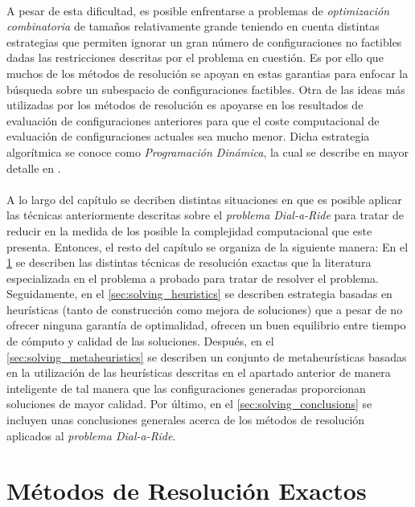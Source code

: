 \documentclass{subfiles}
\begin{document}
      \paragraph{}
      A pesar de esta dificultad, es posible enfrentarse a problemas de \emph{optimización combinatoria} de tamaños relativamente grande teniendo en cuenta distintas estrategias que permiten ignorar un gran número de configuraciones no factibles dadas las restricciones descritas por el problema en cuestión. Es por ello que muchos de los métodos de resolución se apoyan en estas garantias para enfocar la búsqueda sobre un subespacio de configuraciones factibles. Otra de las ideas más utilizadas por los métodos de resolución es apoyarse en los resultados de evaluación de configuraciones anteriores para que el coste computacional de evaluación de configuraciones actuales sea mucho menor. Dicha estrategia algorítmica se conoce como \emph{Programación Dinámica}, la cual se describe en mayor detalle en \cite{bellman1954theory}.


      \paragraph{}
      A lo largo del capítulo se decriben distintas situaciones en que es posible aplicar las técnicas anteriormente descritas sobre el \emph{problema Dial-a-Ride} para tratar de reducir en la medida de los posible la complejidad computacional que este presenta. Entonces, el resto del capítulo se organiza de la siguiente manera: En el \cref{sec:solving_exacts} se describen las distintas técnicas de resolución exactas que la literatura especializada en el problema a probado para tratar de resolver el problema. Seguidamente, en el \cref{sec:solving_heuristics} se describen estrategia basadas en heurísticas (tanto de construcción como mejora de soluciones) que a pesar de no ofrecer ninguna garantía de optimalidad, ofrecen un buen equilibrio entre tiempo de cómputo y calidad de las soluciones. Después, en el \cref{sec:solving_metaheuristics} se describen un conjunto de metaheurísticas basadas en la utilización de las heurísticas descritas en el apartado anterior de manera inteligente de tal manera que las configuraciones generadas proporcionan soluciones de mayor calidad. Por último, en el \cref{sec:solving_conclusions} se incluyen unas conclusiones generales acerca de los métodos de resolución aplicados al \emph{problema Dial-a-Ride}.

    \section{Métodos de Resolución Exactos}
    \label{sec:solving_exacts}
\end{document}
